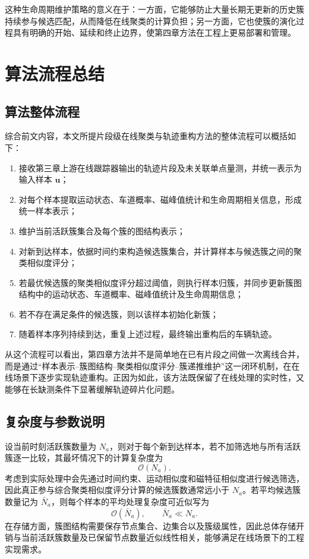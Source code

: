 \documentclass{xdupgthesis}
\begin{document}
这种生命周期维护策略的意义在于：一方面，它能够防止大量长期无更新的历史簇持续参与候选匹配，从而降低在线聚类的计算负担；另一方面，它也使簇的演化过程具有明确的开始、延续和终止边界，使第四章方法在工程上更易部署和管理。

\section{算法流程总结}

\subsection{算法整体流程}

综合前文内容，本文所提片段级在线聚类与轨迹重构方法的整体流程可以概括如下：

\begin{enumerate}
	\item 接收第三章上游在线跟踪器输出的轨迹片段及未关联单点量测，并统一表示为输入样本 $\mathbf{u}$；
	\item 对每个样本提取运动状态、车道概率、磁峰值统计和生命周期相关信息，形成统一样本表示；
	\item 维护当前活跃簇集合及每个簇的图结构表示；
	\item 对新到达样本，依据时间约束构造候选簇集合，并计算样本与候选簇之间的聚类相似度评分；
	\item 若最优候选簇的聚类相似度评分超过阈值，则执行样本归簇，并同步更新簇图结构中的运动状态、车道概率、磁峰值统计及生命周期信息；
	\item 若不存在满足条件的候选簇，则以该样本初始化新簇；
	\item 随着样本序列持续到达，重复上述过程，最终输出重构后的车辆轨迹。
\end{enumerate}

从这个流程可以看出，第四章方法并不是简单地在已有片段之间做一次离线合并，而是通过“样本表示--簇图结构--聚类相似度评分--簇递推维护”这一闭环机制，在在线场景下逐步实现轨迹重构。正因为如此，该方法既保留了在线处理的实时性，又能够在长缺测条件下显著缓解轨迹碎片化问题。

\subsection{复杂度与参数说明}

设当前时刻活跃簇数量为 $N_a$，则对于每个新到达样本，若不加筛选地与所有活跃簇逐一比较，其最坏情况下的计算复杂度为
\begin{equation}
	\mathcal{O}(N_a).
\end{equation}
考虑到实际处理中会先通过时间约束、运动相似度和磁特征相似度进行候选筛选，因此真正参与综合聚类相似度评分计算的候选簇数通常远小于 $N_a$。若平均候选簇数量记为 $\bar N_a$，则每个样本的平均处理复杂度可近似写为
\begin{equation}
	\mathcal{O}(\bar N_a), \qquad \bar N_a \ll N_a.
\end{equation}
在存储方面，簇图结构需要保存节点集合、边集合以及簇级属性，因此总体存储开销与当前活跃簇数量及已保留节点数量近似线性相关，能够满足在线场景下的工程实现需求。
\end{document}
